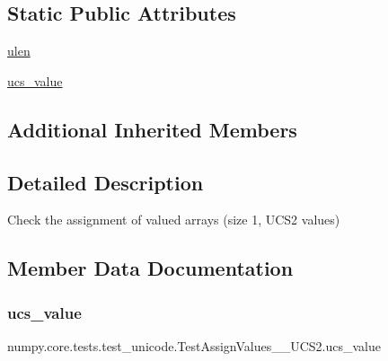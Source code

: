 \subsection*{Static Public Attributes}
\begin{DoxyCompactItemize}
\item 
\hyperlink{classnumpy_1_1core_1_1tests_1_1test__unicode_1_1TestAssignValues__1__UCS2_a5833f4eab238974ac6a58f30986c9712}{ulen}
\item 
\hyperlink{classnumpy_1_1core_1_1tests_1_1test__unicode_1_1TestAssignValues__1__UCS2_a5a7a8cba7154c96f012cec8041e16995}{ucs\+\_\+value}
\end{DoxyCompactItemize}
\subsection*{Additional Inherited Members}


\subsection{Detailed Description}
\begin{DoxyVerb}Check the assignment of valued arrays (size 1, UCS2 values)\end{DoxyVerb}
 

\subsection{Member Data Documentation}
\mbox{\label{classnumpy_1_1core_1_1tests_1_1test__unicode_1_1TestAssignValues__1__UCS2_a5a7a8cba7154c96f012cec8041e16995}} 
\subsubsection{\texorpdfstring{ucs\+\_\+value}{ucs\_value}}
{\footnotesize\ttfamily numpy.\+core.\+tests.\+test\+\_\+unicode.\+Test\+Assign\+Values\+\_\+\_\+\+U\+C\+S2.\+ucs\+\_\+value\hspace{0.3cm}{\ttfamily [static]}}

